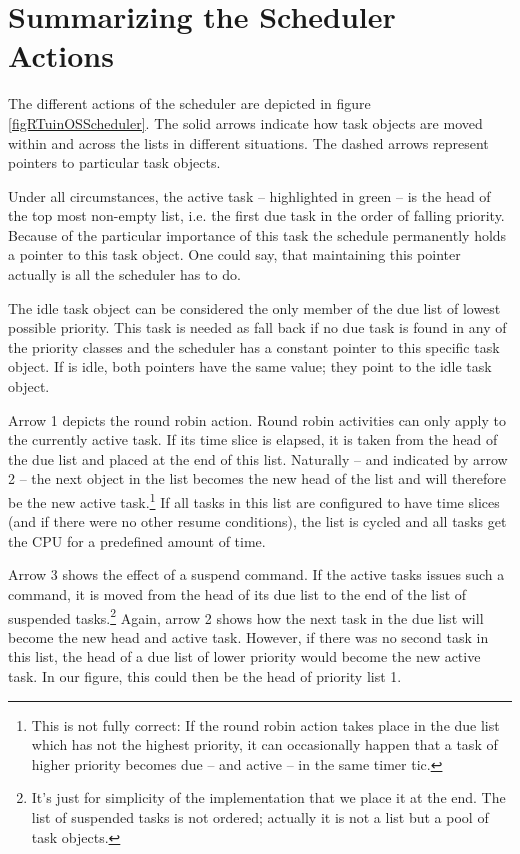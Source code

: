 \section{Summarizing the Scheduler Actions}


The different actions of the scheduler are depicted in figure
\ref{figRTuinOSScheduler}. The solid arrows indicate how task objects are
moved within and across the lists in different situations. The dashed
arrows represent pointers to particular task objects.

Under all circumstances, the active task -- highlighted in green -- is the
head of the top most non-empty list, i.e. the first due task in the order
of falling priority. Because of the particular importance of this task the
schedule permanently holds a pointer to this task object. One could say,
that maintaining this pointer actually is all the scheduler has to do.

The idle task object can be considered the only member of the due list of
lowest possible priority. This task is needed as fall back if no due task
is found in any of the priority classes and the scheduler has a constant
pointer to this specific task object. If \rtos{} is idle, both pointers have
the same value; they point to the idle task object.

Arrow 1 depicts the round robin action. Round robin activities can only
apply to the currently active task. If its time slice is elapsed, it is
taken from the head of the due list and placed at the end of this list.
Naturally -- and indicated by arrow 2 -- the next object in the list
becomes the new head of the list and will therefore be the new active
task.\footnote{This is not fully correct: If the round robin action takes
place in the due list which has not the highest priority, it can
occasionally happen that a task of higher priority becomes due -- and
active -- in the same timer tic.} If all tasks in this list are configured
to have time slices (and if there were no other resume conditions), the
list is cycled and all tasks get the CPU for a predefined amount of time.

Arrow 3 shows the effect of a suspend command. If the active tasks issues
such a command, it is moved from the head of its due list to the end of
the list of suspended tasks.\footnote{It's just for simplicity of the
implementation that we place it at the end. The list of suspended tasks is
not ordered; actually it is not a list but a pool of task objects.} Again,
arrow 2 shows how the next task in the due list will become the new head
and active task. However, if there was no second task in this list, the
head of a due list of lower priority would become the new active task. In
our figure, this could then be the head of priority list 1.

